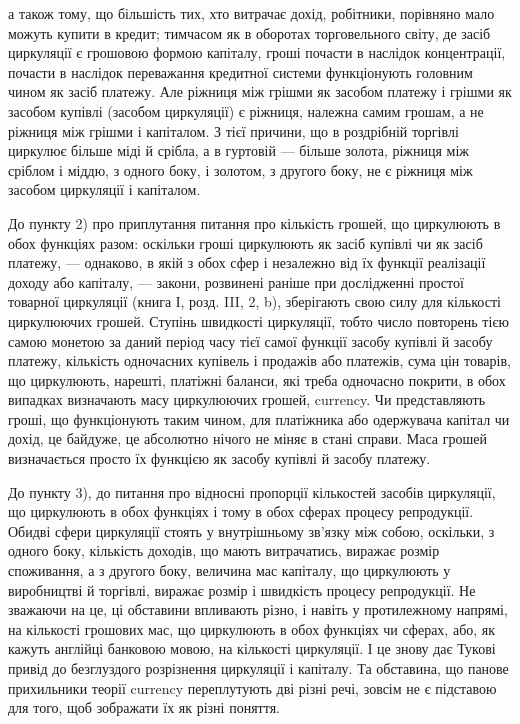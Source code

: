 \parcont{}  %
а також тому, що більшість тих, хто витрачає дохід, робітники,
порівняно мало можуть купити в кредит; тимчасом як в оборотах торговельного світу, де засіб
циркуляції є грошовою
формою капіталу, гроші почасти в наслідок концентрації, почасти в наслідок переважання кредитної
системи функціонують
головним чином як засіб платежу. Але ріжниця між грішми як засобом платежу і грішми як засобом
купівлі (засобом циркуляції)
є ріжниця, належна самим грошам, а не ріжниця між грішми
і капіталом. З тієї причини, що в роздрібній торгівлі циркулює
більше міді й срібла, а в гуртовій — більше золота, ріжниця
між сріблом і міддю, з одного боку, і золотом, з другого боку,
не є ріжниця між засобом циркуляції і капіталом.

До пункту 2) про приплутання питання про кількість грошей, що циркулюють в обох функціях разом:
оскільки гроші
циркулюють як засіб купівлі чи як засіб платежу, — однаково,
в якій з обох сфер і незалежно від їх функції реалізації доходу
або капіталу, — закони, розвинені раніше при дослідженні простої товарної циркуляції (книга І, розд.
III, 2, b), зберігають свою
силу для кількості циркулюючих грошей. Ступінь швидкості
циркуляції, тобто число повторень тією самою монетою за даний
період часу тієї самої функції засобу купівлі й засобу платежу,
кількість одночасних купівель і продажів або платежів, сума
цін товарів, що циркулюють, нарешті, платіжні баланси, які
треба одночасно покрити, в обох випадках визначають масу циркулюючих грошей, currency. Чи
представляють гроші, що функціонують таким чином, для платіжника або одержувача капітал
чи дохід, це байдуже, це абсолютно нічого не міняє в стані
справи. Маса грошей визначається просто їх функцією як засобу купівлі й засобу платежу.

До пункту 3), до питання про відносні пропорції кількостей
засобів циркуляції, що циркулюють в обох функціях і тому
в обох сферах процесу репродукції. Обидві сфери циркуляції
стоять у внутрішньому зв’язку між собою, оскільки, з одного
боку, кількість доходів, що мають витрачатись, виражає розмір
споживання, а з другого боку, величина мас капіталу, що циркулюють у виробництві й торгівлі, виражає
розмір і швидкість
процесу репродукції. Не зважаючи на це, ці обставини впливають різно, і навіть у протилежному
напрямі, на кількості грошових мас, що циркулюють в обох функціях чи сферах, або,
як кажуть англійці банковою мовою, на кількості циркуляції.
І це знову дає Тукові привід до безглуздого розрізнення циркуляції і капіталу. Та обставина, що
панове прихильники теорії
currency переплутують дві різні речі, зовсім не є підставою
для того, щоб зображати їх як різні поняття.

